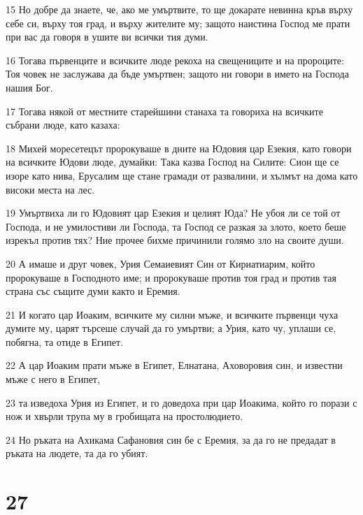 \par 15 Но добре да знаете, че, ако ме умъртвите, то ще докарате невинна кръв върху себе си, върху тоя град, и върху жителите му; защото наистина Господ ме прати при вас да говоря в ушите ви всички тия думи.
\par 16 Тогава първенците и всичките люде рекоха на свещениците и на пророците: Тоя човек не заслужава да бъде умъртвен; защото ни говори в името на Господа нашия Бог.
\par 17 Тогава някой от местните старейшини станаха та говориха на всичките събрани люде, като казаха:
\par 18 Михей моресетецът пророкуваше в дните на Юдовия цар Езекия, като говори на всичките Юдови люде, думайки: Така казва Господ на Силите: Сион ще се изоре като нива, Ерусалим ще стане грамади от развалини, и хълмът на дома като високи места на лес.
\par 19 Умъртвиха ли го Юдовият цар Езекия и целият Юда? Не убоя ли се той от Господа, и не умилостиви ли Господа, та Господ се разкая за злото, което беше изрекъл против тях? Ние прочее бихме причинили голямо зло на своите души.
\par 20 А имаше и друг човек, Урия Семаиевият Син от Кириатиарим, който пророкуваше в Господното име; и пророкуваше против тоя град и против тая страна със същите думи както и Еремия.
\par 21 И когато цар Иоаким, всичките му силни мъже, и всичките първенци чуха думите му, царят търсеше случай да го умъртви; а Урия, като чу, уплаши се, побягна, та отиде в Египет.
\par 22 А цар Иоаким прати мъже в Египет, Елнатана, Аховоровия син, и известни мъже с него в Египет,
\par 23 та изведоха Урия из Египет, и го доведоха при цар Иоакима, който го порази с нож и хвърли трупа му в гробищата на простолюдието.
\par 24 Но ръката на Ахикама Сафановия син бе с Еремия, за да го не предадат в ръката на людете, та да го убият.

\chapter{27}

